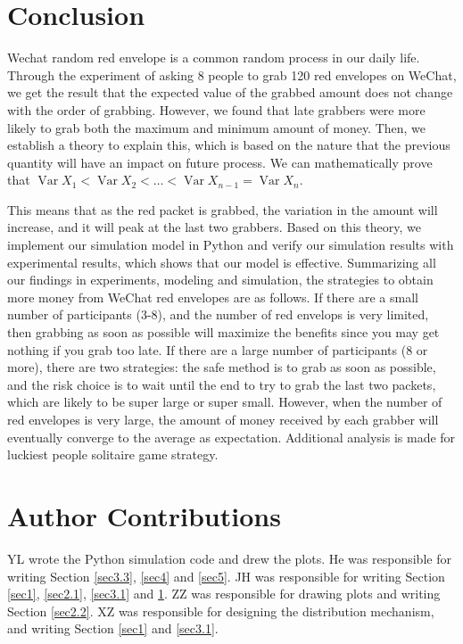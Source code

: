 \documentclass{scrartcl}
\begin{document}
\section{Conclusion}
\label{sec6}
Wechat random red envelope is a common random process in our daily life. Through the experiment of asking 8 people to grab 120 red envelopes on WeChat, we get the result that the expected value of the grabbed amount does not change with the order of grabbing. However, we found that late grabbers were more likely to grab both the maximum and minimum amount of money. Then, we establish a theory to explain this, which is based on the nature that the previous quantity will have an impact on future process. We can mathematically prove that $\operatorname{Var} X_{1}<\operatorname{Var} X_{2}<\ldots<\operatorname{Var} X_{n-1} = \operatorname{Var} X_{n}$.\par
This means that as the red packet is grabbed, the variation in the amount will increase, and it will peak at the last two grabbers. Based on this theory, we implement our simulation model in Python and verify our simulation results with experimental results, which shows that our model is effective. Summarizing all our findings in experiments, modeling and simulation, the strategies to obtain more money from WeChat red envelopes are as follows. If there are a small number of participants (3-8), and the number of red envelops is very limited, then grabbing as soon as possible will maximize the benefits since you may get nothing if you grab too late. If there are a large number of participants (8 or more), there are two strategies: the safe method is to grab as soon as possible, and the risk choice is to wait until the end to try to grab the last two packets, which are likely to be super large or super small. However, when the number of red envelopes is very large, the amount of money received by each grabber will eventually converge to the average as expectation. Additional analysis is made for luckiest people solitaire game strategy.

\section*{Author Contributions}
YL wrote the Python simulation code and drew the plots. He was responsible for writing Section \ref{sec3.3}, \ref{sec4} and \ref{sec5}. JH was responsible for writing Section
\ref{sec1}, \ref{sec2.1}, \ref{sec3.1} and \ref{sec6}. ZZ was responsible for drawing plots and writing Section \ref{sec2.2}. XZ was responsible for designing the distribution mechanism, and writing Section \ref{sec1} and \ref{sec3.1}.
\newpage
\singlespacing

\end{document}
